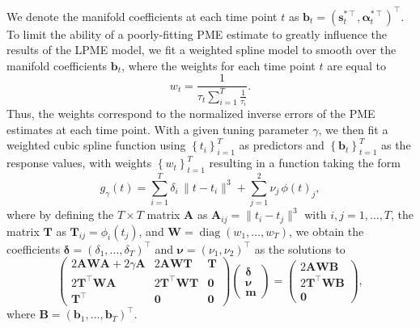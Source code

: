\documentclass[12pt]{article}
\newcommand{\T}{\intercal}
\theoremstyle{definition}
\begin{document}
We denote the manifold coefficients at each time point $t$ as $\mathbf{b}_t = (\mathbf{s}_t^{*\T}, \mathbf{\alpha}_t^{*\T})^\T$. To limit the ability of a poorly-fitting PME estimate to greatly influence the results of the LPME model, we fit a weighted spline model to smooth over the manifold coefficients $\mathbf{b}_t$, where the weights for each time point $t$ are equal to
$$w_t = \frac{1}{\tau_t\sum_{i=1}^{T}\frac{1}{\tau_i}}.$$ Thus, the weights correspond to the normalized inverse errors of the PME estimates at each time point. With a given tuning parameter $\gamma$, we then fit a weighted cubic spline function using $\left\{t_i\right\}_{i=1}^T$ as predictors and $\left\{\mathbf{b}_t\right\}_{t=1}^T$ as the response values, with weights $\left\{w_t\right\}_{t=1}^T$ resulting in a function taking the form
\begin{equation}\nonumber
  g_{\gamma}(t) = \sum_{i=1}^{T}\delta_i \,\|t - t_i\|^{3} + \sum_{j=1}^{2}\nu_j\,\phi(t)_j,
\end{equation}
where by defining the $T \times T$ matrix $\mathbf{A}$ as  $\mathbf{A}_{ij} = \|t_i - t_j\|^{3}$ with $i,j = 1,\ldots, T$, the matrix $\mathbf{T}$ as  $\mathbf{T}_{ij} = \phi_i(t_j)$, and $\mathbf{W} = \operatorname{diag}(w_1, \dots, w_T)$, we obtain the coefficients $\mathbf{\delta}=(\delta_1,\ldots,\delta_T)^\T$ and $\mathbf{\nu}=(\nu_1,\nu_2)^\T$ as the solutions to
\begin{equation}
  \left(
  \begin{array}{ccc}
    2\mathbf{A}\mathbf{W}\mathbf{A} + 2\gamma\mathbf{A} & 2\mathbf{A}\mathbf{W}\mathbf{T} & \mathbf{T} \\
    2\mathbf{T}^\T\mathbf{W}\mathbf{A} & 2\mathbf{T}^\T\mathbf{W}\mathbf{T} & \mathbf{0} \\
    \mathbf{T}^\T & \mathbf{0} & \mathbf{0}
  \end{array}
  \right)\left(
  \begin{array}{c}
    \mathbf{\delta} \\
    \mathbf{\nu} \\
    \mathbf{m}
  \end{array}
  \right) = \left(
  \begin{array}{c}
    2\mathbf{A}\mathbf{W}\mathbf{B} \\
    2\mathbf{T}^\T\mathbf{W}\mathbf{B} \\
    \mathbf{0}
  \end{array}
  \right), \label{eq:16}
\end{equation}
where $\mathbf{B}=(\mathbf{b}_1,\ldots, \mathbf{b}_T)^\T$.
\end{document}

